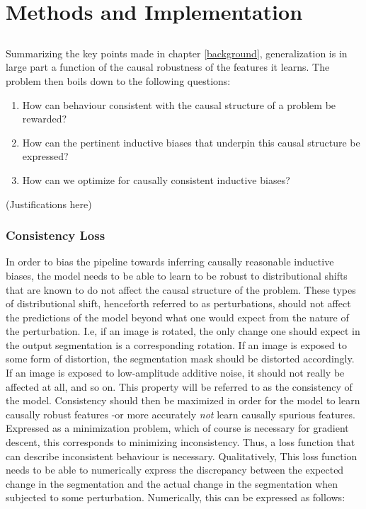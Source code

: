 \chapter{Methods and Implementation}
\setcounter{chapter}{3}
\section{\alg}
	Summarizing the key points made in chapter \ref{background}, generalization is in large part a function of the causal robustness of the features it learns. The problem then boils down to the following questions:
	\begin{enumerate}
		\item How can behaviour consistent with the causal structure of a problem be rewarded? \label{loss}
		\item How can the pertinent inductive biases that underpin this causal structure be expressed? \label{mnv}
		\item How can we optimize for causally consistent inductive biases?\label{training}
	\end{enumerate}
	
	(Justifications here)

	\subsection{Consistency Loss}
    In order to bias the pipeline towards inferring causally reasonable inductive biases, the model needs to be able to learn to be robust to distributional shifts that are known to do not affect the causal structure of the problem. These types of distributional shift, henceforth referred to as perturbations, should not affect the predictions of the model beyond what one would expect from the nature of the perturbation. I.e, if an image is rotated, the only change one should expect in the output segmentation is a corresponding rotation. If an image is exposed to some form of distortion, the segmentation mask should be distorted accordingly. If an image is exposed to low-amplitude additive noise, it should not really be affected at all, and so on. This property will be referred to as the consistency of the model. Consistency should then be maximized in order for the model to learn causally robust features -or more accurately \textit{not} learn causally spurious features. Expressed as a minimization problem, which of course is necessary for gradient descent, this corresponds to minimizing inconsistency. Thus, a loss function that can describe inconsistent behaviour is necessary. Qualitatively, This loss function needs to be able to numerically express the discrepancy between the expected change in the segmentation and the actual change in the segmentation when subjected to some perturbation. Numerically, this can be expressed as follows:

